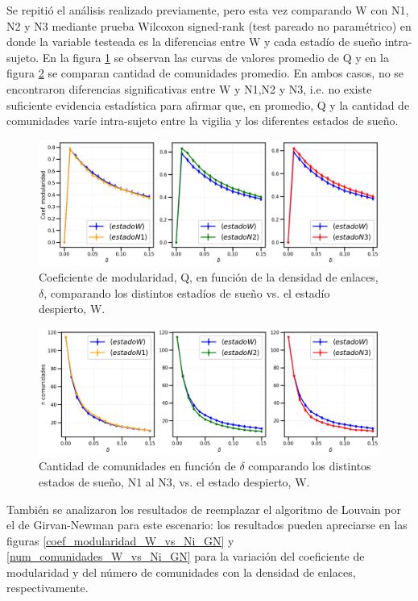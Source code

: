 \documentclass{article}
\begin{document}
Se repitió el análisis realizado previamente, pero esta vez comparando W con N1, N2 y N3 mediante prueba Wilcoxon signed-rank (test pareado no paramétrico) en donde la variable testeada es la diferencias entre W y cada estadío de sueño intra-sujeto. En la figura \ref{fg_modularidad_W_vs_Ni} se observan las curvas de valores promedio de Q y en la figura \ref{fg_comunidades_W_vs_Ni} se comparan cantidad de comunidades promedio. En ambos casos, no se encontraron diferencias significativas entre W y N1,N2 y N3, i.e. no existe suficiente evidencia estadística para afirmar que, en promedio, Q y la cantidad de comunidades varíe intra-sujeto entre la vigilia y los diferentes estados de sueño. 


\begin{figure}[!htb]
	\centering
	\includegraphics[width= 0.9\linewidth]{fg/modularidad_W_vs_Ni.png}
	\caption{Coeficiente de modularidad, Q, en función de la densidad de enlaces, $\delta$, comparando los distintos estadíos de sueño vs. el estadío despierto, W.
	}
	\label{fg_modularidad_W_vs_Ni}
\end{figure}
 
\begin{figure}[!htb]
	\centering
	\includegraphics[width= 0.9\linewidth]{fg/comunidades_W_vs_Ni.png}
	\caption{Cantidad de comunidades en función de $\delta$ comparando los distintos estados de sueño, N1 al N3, vs. el estado despierto, W.
	}
	\label{fg_comunidades_W_vs_Ni}
\end{figure}

También se analizaron los resultados de reemplazar el algoritmo de Louvain por el de Girvan-Newman para este escenario: los resultados pueden apreciarse en las figuras \ref{coef_modularidad_W_vs_Ni_GN} y \ref{num_comunidades_W_vs_Ni_GN} para la variación del coeficiente de modularidad y del número de comunidades con la densidad de enlaces, respectivamente.
\end{document}
